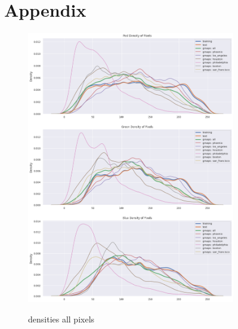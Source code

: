 \documentclass[10pt,conference,compsocconf]{IEEEtran}
\begin{document}
\begin{figure}[ht]
\section{Appendix}
    \centering
    \begin{subfigure}{0.495\textwidth}
        \includegraphics[width=.9\textwidth]{pictures/distr_pixels.png}
        \label{fig:distr_pixels}
        \caption{densities all pixels}
    \end{subfigure}%
    \begin{subfigure}{0.495\textwidth}

\end{subfigure}
\end{figure}
\end{document}
